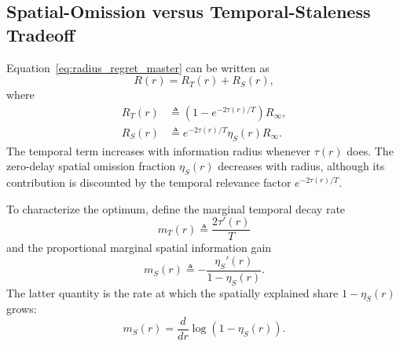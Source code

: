 \documentclass[11pt]{article}
\begin{document}
\subsection{Spatial-Omission versus Temporal-Staleness Tradeoff}
\label{subsec:spatial_temporal_tradeoff}

Equation~\eqref{eq:radius_regret_master} can be written as
\begin{equation}
    R(r)
    =
    R_T(r)+R_S(r),
    \label{eq:R_decomposition}
\end{equation}
where
\begin{align}
    R_T(r)
    &\triangleq
    \left(
        1-e^{-2\tau(r)/T}
    \right)R_\infty,
    \label{eq:temporal_component}
    \\
    R_S(r)
    &\triangleq
    e^{-2\tau(r)/T}
    \eta_S(r)R_\infty.
    \label{eq:spatial_component}
\end{align}
The temporal term increases with information radius whenever $\tau(r)$ does.
The zero-delay spatial omission fraction $\eta_S(r)$ decreases with radius,
although its contribution is discounted by the temporal relevance factor
$e^{-2\tau(r)/T}$.

To characterize the optimum, define the marginal temporal decay rate
\begin{equation}
    m_T(r)
    \triangleq
    \frac{2\tau'(r)}{T}
    \label{eq:marginal_temporal_cost}
\end{equation}
and the proportional marginal spatial information gain
\begin{equation}
    m_S(r)
    \triangleq
    -\frac{
        \eta_S'(r)
    }{
        1-\eta_S(r)
    }.
    \label{eq:marginal_spatial_gain}
\end{equation}
The latter quantity is the rate at which the spatially explained share
$1-\eta_S(r)$ grows:
\begin{equation}
    m_S(r)
    =
    \frac{d}{dr}
    \log
    \left(
        1-\eta_S(r)
    \right).
    \label{eq:marginal_spatial_log_gain}
\end{equation}
\end{document}
